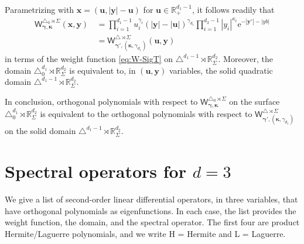 \documentclass{amsart}
\theoremstyle{remark}
\def\e{\mathrm{e}}
\def\sW{{\mathsf W}}
\def\g{{\gamma}}
\def\k{{\kappa}}
\def\ub{{\bm u}}
\def\xb{{\bm x}}
\def\yb{{\bm y}}
\def\RR{{\mathbb R}}
\def\bg{{\boldsymbol{\gamma}}}
\def\bk{{\boldsymbol{\kappa}}}
\begin{document}
Parametrizing with $\xb = (\ub, |\yb|- \ub)$ for $\ub \in \RR_+^{d_1-1}$, it follows readily that 
\begin{align*}
     \sW_{\bg, \bk}^{\triangle_0 \rtimes \Sigma} (\bm x, \bm y) 
    \,& = \prod_{i=1}^{d_1-1} u_i^{\g_i}(|\yb|-|\ub|)^{\g_{d_1}} \prod_{i=1}^{d_2-1} |y_i|^{\k_i} \e^{-|\yb'|-|yb|} \\
   \, & = \sW_{\bg', (\bk, \g_{d_1})}^{\triangle \rtimes \Sigma} (\ub, \yb)
\end{align*}
in terms of the weight function \eqref{eq:W-SigT} on $\triangle^{d_1-1}\! \rtimes \RR_\Sigma^{d_2}$. Moreover,
the domain $\triangle_0^{d_1} \!\rtimes \RR_\Sigma^{d_2}$ is equivalent to, in $(\ub, \yb)$ variables, 
the solid quadratic domain $\triangle^{d_1-1}\! \rtimes \RR_\Sigma^{d_2}$. 

In conclusion, orthogonal polynomials with respect to $ \sW_{\bg, \bk}^{\triangle_0 \rtimes \Sigma}$ on the
surface $\triangle_0^{d_1} \!\rtimes \RR_\Sigma^{d_2}$ is equivalent to the orthogonal polynomials 
with respect to  $\sW_{\bg', (\bk, \g_{d_1})}^{\triangle \rtimes \Sigma}$ on the solid domain 
$\triangle^{d_1-1}\! \rtimes \RR_\Sigma^{d_2}$. 
\fi

\appendix

\section{Spectral operators for $d =3$}

We give a list of second-order linear differential operators, in three variables, that have orthogonal polynomials 
as eigenfunctions. In each case, the list provides the weight function, the domain, and the spectral operator. The 
first four are product Hermite/Laguerre polynomials, and we write H = Hermite and L = Laguerre. 
 
\end{document}
